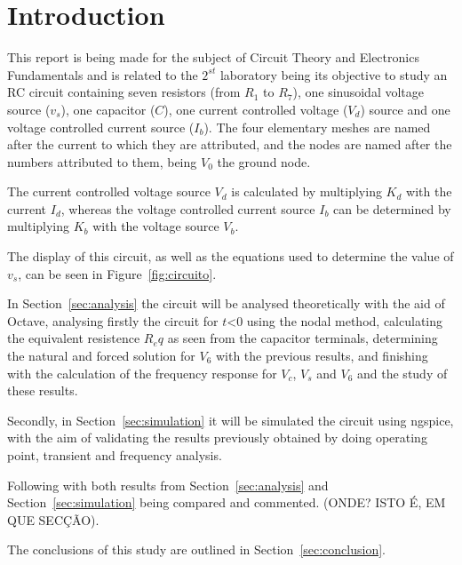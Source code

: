 \section{Introduction}
\label{sec:introduction}


\hspace{0,5cm} This report is being made for the subject of Circuit Theory and Electronics Fundamentals and is related to the $2^{st}$ laboratory being its objective to study an RC circuit containing seven resistors (from $R_1$ to $R_7$), one sinusoidal voltage source ($v_s$), one capacitor ($C$), one current controlled voltage ($V_d$) source and one voltage controlled current source ($I_b$). The four elementary meshes are named after the current to which they are attributed, and the nodes are named after the numbers attributed to them, being $V_0$ the ground node.

The current controlled voltage source $V_d$ is calculated by multiplying $K_d$ with the current $I_d$, whereas the voltage controlled current source $I_b$ can be determined by multiplying $K_b$ with the voltage source $V_b$.

The display of this circuit, as well as the equations used to determine the value of $v_s$, can be seen in Figure~\ref{fig:circuito}.

In Section~\ref{sec:analysis} the circuit will be analysed theoretically with the aid of Octave, analysing firstly the circuit for $t$<0 using the nodal method, calculating the equivalent resistence $R_eq$ as seen from the capacitor terminals, determining the natural and forced solution for $V_6$ with the previous results, and finishing with the calculation of the frequency response for $V_c$, $V_s$ and $V_6$ and the study of these results.

Secondly, in Section~\ref{sec:simulation} it will be simulated the circuit using ngspice, with the aim of validating the results previously obtained by doing operating point, transient and frequency analysis.

Following with both results from Section~\ref{sec:analysis} and Section~\ref{sec:simulation} being compared and commented. (ONDE? ISTO É, EM QUE SECÇÃO).

The conclusions of this study are outlined in Section~\ref{sec:conclusion}.

